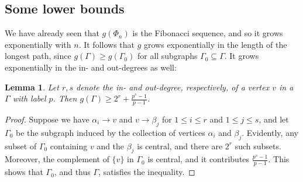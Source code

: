 \documentclass[a4paper, 12pt]{article}
\newcommand{\aut}[1]{\operatorname{Aut}(#1)}
\newcommand{\cyc}[1]{\operatorname{C}_{#1}}
\theoremstyle{plain}
\newtheorem{lem}{Lemma}[section]
\theoremstyle{definition}
\begin{document}
\subsection{Some lower bounds}
We have already seen that $g(\Phi_n)$ is the Fibonacci sequence, and so it grows exponentially with $n$. It follows that $g$ grows exponentially in the length of the longest path, since $g(\Gamma) \ge  g(\Gamma_0)$ for all subgraphs $\Gamma_0 \subseteq \Gamma$. It grows exponentially in the in- and out-degrees as well:
\begin{lem}
	Let $r, s$ denote the in- and out-degree, respectively, of a vertex $v$ in a  $\Gamma$ with label $p$. Then $g(\Gamma) \ge 2^r + \frac{p^s - 1}{p - 1}$.
\end{lem}
\begin{proof}
	Suppose we have $\alpha_i \rightarrow v$ and $v \rightarrow \beta_j$ for $1 \le i \le r$ and $1 \le j \le s$, and let $\Gamma_0$ be the subgraph induced by the collection of vertices $\alpha_i$ and $\beta_j$. Evidently, any subset of $\Gamma_0$ containing $v$ and the $\beta_j$ is central, and there are $2^r$ such subsets. Moreover, the complement of $\{v\}$ in $\Gamma_0$ is central, and it contributes $\frac{p^s - 1}{p - 1}$. This shows that $\Gamma_0$, and thus $\Gamma$, satisfies the inequality.
\end{proof}	
\end{document}
